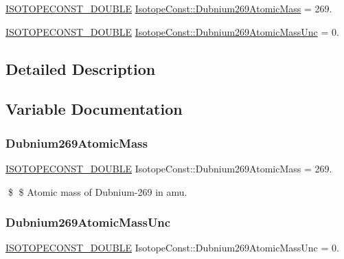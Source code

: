 \begin{DoxyCompactItemize}
\item 
\mbox{\hyperlink{group___isotope_const-_macros_ga8f45a7272ce02c0b4c65c44636ed719a}{I\+S\+O\+T\+O\+P\+E\+C\+O\+N\+S\+T\+\_\+\+D\+O\+U\+B\+LE}} \mbox{\hyperlink{group___isotope_const-_dubnium-_db269_ga2d399c6443546689e97c3fc830f5378b}{Isotope\+Const\+::\+Dubnium269\+Atomic\+Mass}} = 269.
\item 
\mbox{\hyperlink{group___isotope_const-_macros_ga8f45a7272ce02c0b4c65c44636ed719a}{I\+S\+O\+T\+O\+P\+E\+C\+O\+N\+S\+T\+\_\+\+D\+O\+U\+B\+LE}} \mbox{\hyperlink{group___isotope_const-_dubnium-_db269_gae23786841eb4c3e73f392924655e510c}{Isotope\+Const\+::\+Dubnium269\+Atomic\+Mass\+Unc}} = 0.
\end{DoxyCompactItemize}


\subsection{Detailed Description}


\subsection{Variable Documentation}
\mbox{\label{group___isotope_const-_dubnium-_db269_ga2d399c6443546689e97c3fc830f5378b}} 
\subsubsection{\texorpdfstring{Dubnium269\+Atomic\+Mass}{Dubnium269AtomicMass}}
{\footnotesize\ttfamily \mbox{\hyperlink{group___isotope_const-_macros_ga8f45a7272ce02c0b4c65c44636ed719a}{I\+S\+O\+T\+O\+P\+E\+C\+O\+N\+S\+T\+\_\+\+D\+O\+U\+B\+LE}} Isotope\+Const\+::\+Dubnium269\+Atomic\+Mass = 269.}

\$ \$ Atomic mass of Dubnium-\/269 in amu. \mbox{\label{group___isotope_const-_dubnium-_db269_gae23786841eb4c3e73f392924655e510c}} 
\subsubsection{\texorpdfstring{Dubnium269\+Atomic\+Mass\+Unc}{Dubnium269AtomicMassUnc}}
{\footnotesize\ttfamily \mbox{\hyperlink{group___isotope_const-_macros_ga8f45a7272ce02c0b4c65c44636ed719a}{I\+S\+O\+T\+O\+P\+E\+C\+O\+N\+S\+T\+\_\+\+D\+O\+U\+B\+LE}} Isotope\+Const\+::\+Dubnium269\+Atomic\+Mass\+Unc = 0.}

